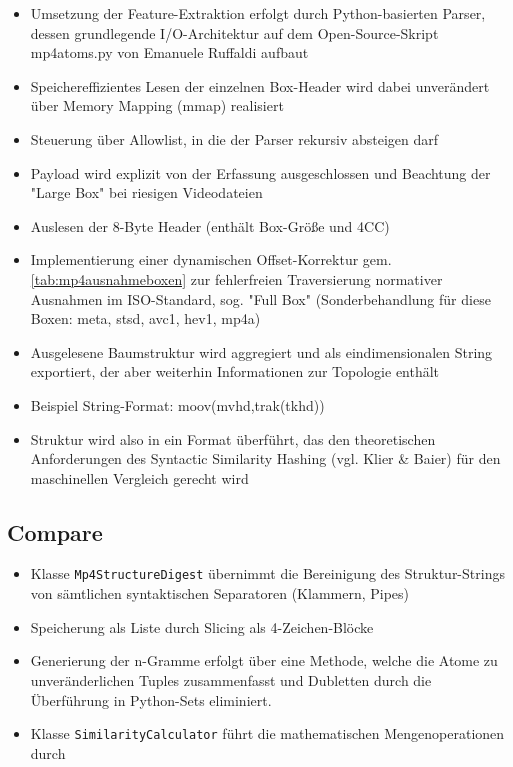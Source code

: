 \begin{itemize}
    \item Umsetzung der Feature-Extraktion erfolgt durch Python-basierten Parser, dessen grundlegende I/O-Architektur auf dem Open-Source-Skript mp4atoms.py von Emanuele Ruffaldi aufbaut \cite{emanuele_ruffaldi_dump_2024}
    \item Speichereffizientes Lesen der einzelnen Box-Header wird dabei unverändert über Memory Mapping (mmap) realisiert
    \item Steuerung über Allowlist, in die der Parser rekursiv absteigen darf
    \item Payload wird explizit von der Erfassung ausgeschlossen und Beachtung der "Large Box" bei riesigen Videodateien \cite[Kap. 4.2]{iso_14496-12_2022}
    \item Auslesen der 8-Byte Header (enthält Box-Größe und 4CC)
    \item Implementierung einer dynamischen Offset-Korrektur gem. \cref{tab:mp4ausnahmeboxen} zur fehlerfreien Traversierung normativer Ausnahmen im ISO-Standard, sog. "Full Box" (Sonderbehandlung für diese Boxen: meta, stsd, avc1, hev1, mp4a)
    \item Ausgelesene Baumstruktur wird aggregiert und als eindimensionalen String exportiert, der aber weiterhin Informationen zur Topologie enthält
    \item Beispiel String-Format: moov(mvhd,trak(tkhd))
    \item Struktur wird also in ein Format überführt, das den theoretischen Anforderungen des Syntactic Similarity Hashing (vgl. Klier \& Baier\cite{klier_github_2025}) für den maschinellen Vergleich gerecht wird
\end{itemize}



\subsection{Compare}

\begin{itemize}
    \item Klasse \verb|Mp4StructureDigest| übernimmt die Bereinigung des Struktur-Strings von sämtlichen syntaktischen Separatoren (Klammern, Pipes)
    \item Speicherung als Liste durch Slicing als 4-Zeichen-Blöcke
    \item Generierung der n-Gramme erfolgt über eine Methode, welche die Atome zu unveränderlichen Tuples zusammenfasst und Dubletten durch die Überführung in Python-Sets eliminiert.
    \item Klasse \verb|SimilarityCalculator| führt die mathematischen Mengenoperationen durch 
\end{itemize}



